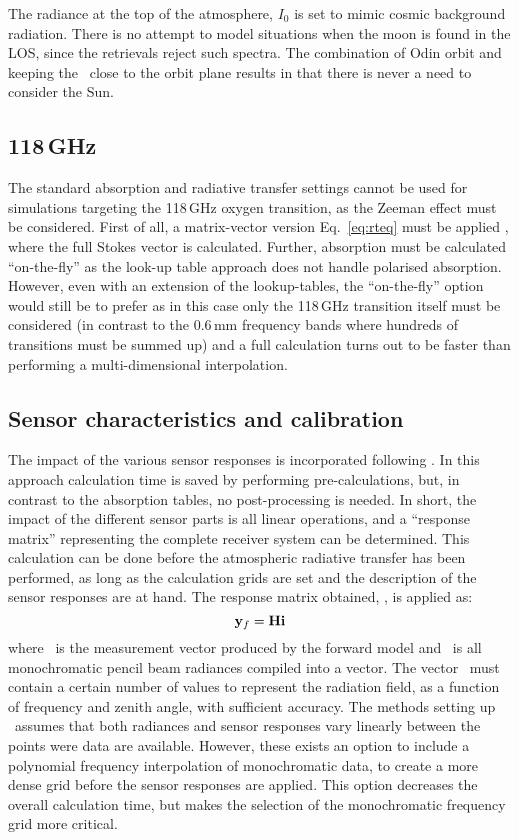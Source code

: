 The radiance at the top of the atmosphere, $I_0$ is set to mimic cosmic
background radiation. There is no attempt to model situations when the moon is
found in the LOS, since the retrievals reject such spectra. The combination of Odin
orbit and keeping the \LOS\ close to the orbit plane results in that there is
never a need to consider the Sun.



\subsection{118\,GHz}
%
The standard absorption and radiative transfer settings cannot be used for
simulations targeting the 118\,GHz oxygen transition, as the Zeeman effect must
be considered. First of all, a matrix-vector version Eq.~\ref{eq:rteq} must be
applied \citep{larsson:zeema:14}, where the full Stokes vector is calculated.
Further, absorption must be calculated ``on-the-fly'' as the look-up table
approach does not handle polarised absorption. However, even with an extension
of the lookup-tables, the ``on-the-fly'' option would still be to prefer as in
this case only the 118\,GHz transition itself must be considered (in contrast
to the 0.6\,mm frequency bands where hundreds of transitions must be summed
up) and a full calculation turns out to be faster than performing a
multi-dimensional interpolation.


\subsection{Sensor characteristics and calibration}
%
The impact of the various sensor responses is incorporated following
\citet{eriksson:06}. In this approach calculation time is saved by
performing pre-calculations, but, in contrast to the absorption tables, no
post-processing is needed. In short, the impact of the different sensor parts
is all linear operations, and a ``response matrix'' representing the complete
receiver system can be determined. This calculation can be done before the
atmospheric radiative transfer has been performed, as long as the calculation
grids are set and the description of the sensor responses are at hand. The
response matrix obtained, \SnsMtr, is applied as:
\begin{equation}
  \label{eq:H}
  \mathbf{y}_{f} = \mathbf{H}\mathbf{i}
\end{equation}
where \ is the measurement vector produced by the forward model and
\MpiVct\ is all monochromatic pencil beam radiances compiled into a vector. The
vector \MpiVct\ must contain a certain number of values to represent the
radiation field, as a function of frequency and zenith angle, with sufficient
accuracy. The methods setting up \SnsMtr\ assumes that both radiances and
sensor responses vary linearly between the points were data are available.
However, these exists an option to include a polynomial frequency interpolation
of monochromatic data, to create a more dense grid before the sensor responses
are applied. This option decreases the overall calculation time, but makes the
selection of the monochromatic frequency grid more critical.

